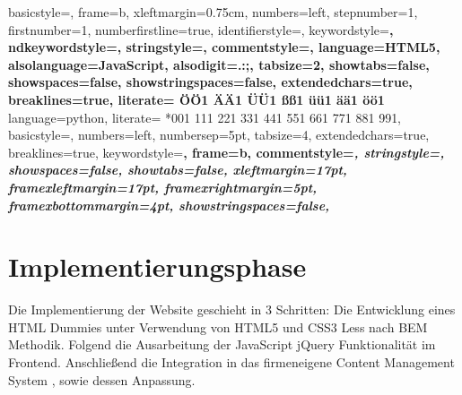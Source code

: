  {%
  basicstyle={\footnotesize\ttfamily},   
  frame=b,
  xleftmargin={0.75cm},
  numbers=left,
  stepnumber=1,
  firstnumber=1,
  numberfirstline=true,	
  identifierstyle=\color{black},
  keywordstyle=\color{blue}\bfseries,
  ndkeywordstyle=\color{editorGreen}\bfseries,
  stringstyle=\color{editorOcher}\ttfamily,
  commentstyle=\color{brown}\ttfamily,
  language=HTML5,
  alsolanguage=JavaScript,
  alsodigit={.:;},	
  tabsize=2,
  showtabs=false,
  showspaces=false,
  showstringspaces=false,
  extendedchars=true,
  breaklines=true,
  literate=%
  {Ö}{{\"O}}1
  {Ä}{{\"A}}1
  {Ü}{{\"U}}1
  {ß}{{\ss}}1
  {ü}{{\"u}}1
  {ä}{{\"a}}1
  {ö}{{\"o}}1
}
%
 {%
language=python,
literate=%
*{0}{{{\color{lightred}0}}}1
{1}{{{\color{lightred}1}}}1
{2}{{{\color{lightred}2}}}1
{3}{{{\color{lightred}3}}}1
{4}{{{\color{lightred}4}}}1
{5}{{{\color{lightred}5}}}1
{6}{{{\color{lightred}6}}}1
{7}{{{\color{lightred}7}}}1
{8}{{{\color{lightred}8}}}1
{9}{{{\color{lightred}9}}}1,
basicstyle=\footnotesize\ttfamily, %
numbers=left,               %
numbersep=5pt,              %
tabsize=4,                  %
extendedchars=true,         %
breaklines=true,            %
keywordstyle=\color{blue}\bfseries,
frame=b,
commentstyle=\color{brown}\itshape,
stringstyle=\color{editorOcher}\ttfamily, %
showspaces=false,           %
showtabs=false,             %
xleftmargin=17pt,
framexleftmargin=17pt,
framexrightmargin=5pt,
framexbottommargin=4pt,
showstringspaces=false,      %
}%
%

\section{Implementierungsphase} 
\label{sec:Implementierungsphase}
Die Implementierung der Website geschieht in 3 Schritten: 
Die Entwicklung eines HTML Dummies unter Verwendung von \acs{HTML}5 und
\ac{CSS}3 \bzw  Less nach \acs{BEM} Methodik. Folgend die Ausarbeitung
der JavaScript \bzw jQuery Funktionalität im Frontend. Anschließend die Integration in 
das firmeneigene Content Management System \ct, sowie dessen Anpassung.

